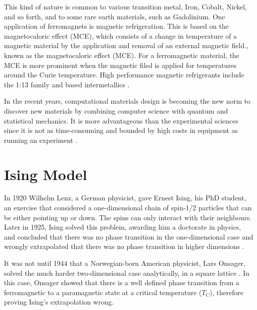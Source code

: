 This kind of nature is common to various transition metal, Iron, Cobalt, Nickel, and so forth, and to some rare earth materials, such as Gadolinium.
One application of ferromagnets is magnetic refrigeration. This is based on the magnetocaloric effect (MCE), which consists of a change in temperature of a magnetic material by the application and removal of an external magnetic field., known as the magnetocaloric effect (MCE). For a ferromagnetic material, the MCE is more prominent when the magnetic filed is applied for temperatures around the Curie temperature. 
High performance magnetic refrigerants include the  1:13 family \cite{Sanvito2017} and  based intermetallics \cite{Gutfleisch2011}. 


In the recent years, computational materials design is becoming the new norm to discover new materials by combining computer science with quantum and statistical mechanics. It is more advantageous than the experimental sciences since it is not as time-consuming and bounded by high costs in equipment as running an experiment \cite{Curtarolo2013,Chen2019}. 

\section{Ising Model}

In 1920 Wilhelm Lenz, a German physicist, gave Ernest Ising, his PhD student, an exercise that considered a one-dimensional chain of spin-1/2 particles that can be either pointing up or down. The spins can only interact with their neighbours. Later in 1925, Ising solved this problem, awarding him a doctorate in physics,  and concluded that there was no phase transition in the one-dimensional case and wrongly extrapolated that there was no phase transition in higher dimensions \cite{Ising1925}.

It was not until 1944 that a Norwegian-born American physicist, Lars Onsager, solved the much harder two-dimensional case analytically, in a square lattice \cite{Onsager1944}. In this case, Onsager showed that there is a well defined phase transition from a ferromagnetic to a paramagnetic state at a critical temperature ($T_C$), therefore proving Ising's extrapolation wrong.

